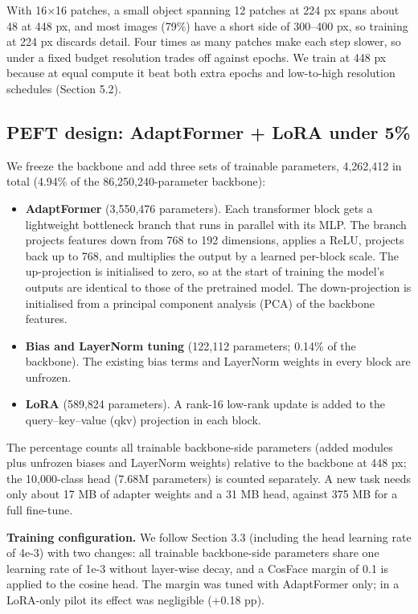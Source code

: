 With 16$\times$16 patches, a small object spanning 12 patches at 224 px spans about 48 at 448 px, and most images (79\%) have a short side of 300--400 px, so training at 224 px discards detail. Four times as many patches make each step slower, so under a fixed budget resolution trades off against epochs. We train at 448 px because at equal compute it beat both extra epochs and low-to-high resolution schedules (Section 5.2).

\subsection{PEFT design: AdaptFormer + LoRA under 5\%}\label{peft-design-adaptformer-lora-under-5}

We freeze the backbone and add three sets of trainable parameters, 4,262,412 in total (4.94\% of the 86,250,240-parameter backbone):

\begin{itemize}
\item
  \textbf{AdaptFormer} (3,550,476 parameters). Each transformer block gets a lightweight bottleneck branch that runs in parallel with its MLP. The branch projects features down from 768 to 192 dimensions, applies a ReLU, projects back up to 768, and multiplies the output by a learned per-block scale. The up-projection is initialised to zero, so at the start of training the model's outputs are identical to those of the pretrained model. The down-projection is initialised from a principal component analysis (PCA) of the backbone features.
\item
  \textbf{Bias and LayerNorm tuning} (122,112 parameters; 0.14\% of the backbone). The existing bias terms and LayerNorm weights in every block are unfrozen.
\item
  \textbf{LoRA} (589,824 parameters). A rank-16 low-rank update is added to the query--key--value (qkv) projection in each block.
\end{itemize}

The percentage counts all trainable backbone-side parameters (added modules plus unfrozen biases and LayerNorm weights) relative to the backbone at 448 px; the 10,000-class head (7.68M parameters) is counted separately. A new task needs only about 17 MB of adapter weights and a 31 MB head, against 375 MB for a full fine-tune.

\textbf{Training configuration.} We follow Section 3.3 (including the head learning rate of 4e-3) with two changes: all trainable backbone-side parameters share one learning rate of 1e-3 without layer-wise decay, and a CosFace margin of 0.1 is applied to the cosine head. The margin was tuned with AdaptFormer only; in a LoRA-only pilot its effect was negligible (+0.18 pp).

